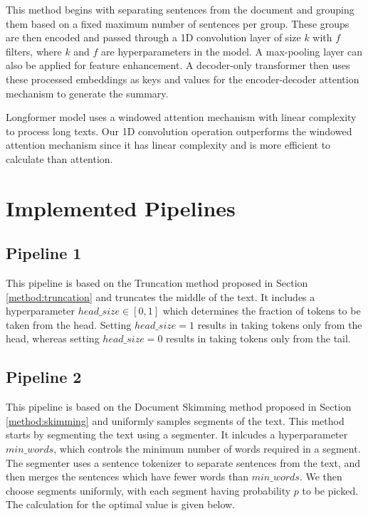 This method begins with separating sentences from the document and grouping them
based on a fixed maximum number of sentences per group.
These groups are then encoded and passed through a 1D convolution layer of size $k$ with
$f$ filters, where $k$ and $f$ are hyperparameters in the model.
A max-pooling layer can also be applied for feature enhancement.
A decoder-only transformer then uses these processed embeddings as keys and values
for the encoder-decoder attention mechanism to generate the summary.

Longformer model \cite{beltagy2020longformer} uses a windowed attention mechanism with
linear complexity to process long texts.
Our 1D convolution operation outperforms the windowed attention mechanism since it has
linear complexity and is more efficient to calculate than attention.


\section{Implemented Pipelines}


\subsection*{Pipeline 1}

This pipeline is based on the Truncation method proposed in Section \ref{method:truncation}
and truncates the middle of the text.
It includes a hyperparameter $head\_size \in [0, 1]$ which determines the fraction of tokens
to be taken from the head.
Setting $head\_size = 1$ results in taking tokens only from the head, whereas
setting $head\_size = 0$ results in taking tokens only from the tail.


\subsection*{Pipeline 2}

This pipeline is based on the Document Skimming method proposed in Section \ref{method:skimming}
and uniformly samples segments of the text.
This method starts by segmenting the text using a segmenter.
It inlcudes a hyperparameter $min\_words$, which controls the minimum number of words required
in a segment.
The segmenter uses a sentence tokenizer to separate sentences from the text, and then
merges the sentences which have fewer words than $min\_words$.
We then choose segments uniformly, with each segment having probability $p$ to be picked.
The calculation for the optimal value is given below.

